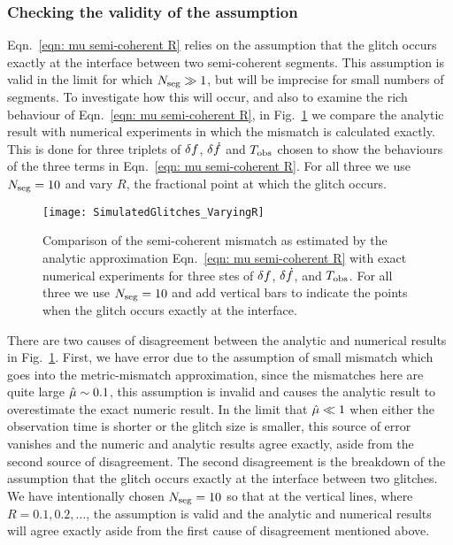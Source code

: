 \documentclass[../full_thesis/full_thesis.tex]{subfiles}
\begin{document}
\subsubsection{Checking the validity of the assumption}
Eqn.~\eqref{eqn: mu semi-coherent R} relies on the assumption that the glitch
occurs exactly at the interface between two semi-coherent segments. This
assumption is valid in the limit for which $N_{\textrm{seg}} \gg 1$, but will be imprecise
for small numbers of segments. To investigate how this will occur, and also to
examine the rich behaviour of Eqn.~\eqref{eqn: mu semi-coherent R}, in
Fig.~\ref{fig: varyingR} we compare the analytic result with numerical
experiments in which the mismatch is calculated exactly. This is done for three
triplets of $\delta f$, $\delta\dot{f}$ and $T_{\mathrm{obs}}$ chosen to show the behaviours of the
three terms in Eqn.~\eqref{eqn: mu semi-coherent R}. For all three we use
$N_{\textrm{seg}}=10$ and vary $R$, the fractional point at which the glitch occurs.
\begin{figure}
\centering
\texttt{[image: SimulatedGlitches\_VaryingR]}
\caption{Comparison of the semi-coherent mismatch as estimated by the analytic
         approximation Eqn.~\eqref{eqn: mu semi-coherent R} with
         exact numerical experiments for three stes of $\delta f$,
         $\delta\dot{f}$, and $T_{\mathrm{obs}}$. For all three we use $N_{\textrm{seg}}=10$ and add vertical bars
         to indicate the points when the glitch occurs exactly at the interface.}
\label{fig: varyingR}
\end{figure}

There are two causes of disagreement between the analytic and numerical results
in Fig.~\ref{fig: varyingR}. First, we have error due to the assumption of small
mismatch which goes into the metric-mismatch approximation, since the
mismatches here are quite large $\hat{\mu} \sim 0.1$, this assumption is invalid
and causes the analytic result to overestimate the exact numeric
result. In the limit that $\hat{\mu} \ll 1$ when either the observation time is
shorter or the glitch size is smaller, this source of error vanishes and the
numeric and analytic results agree exactly, aside
from the second source of disagreement.  The second disagreement is the
breakdown of the assumption that the glitch occurs exactly at the interface
between two glitches. We have intentionally chosen $N_{\textrm{seg}}=10$ so that at the
vertical lines, where $R=0.1, 0.2, \dots$, the assumption is valid and the
analytic and numerical results will agree exactly aside from the first cause
of disagreement mentioned above.
\end{document}
